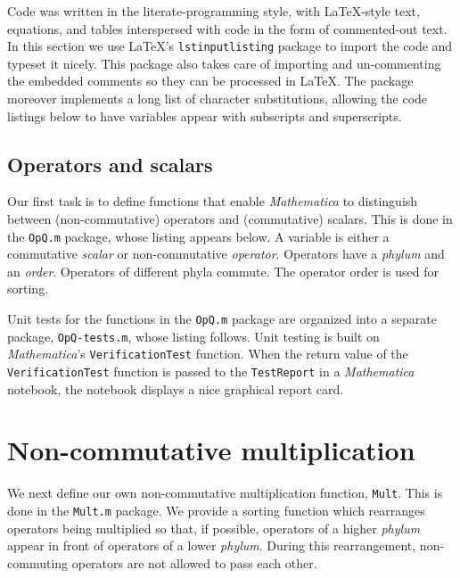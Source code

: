 \documentclass[12pt,letterpaper]{refart}
\begin{document}
Code was written in the literate-programming style, with \LaTeX{}-style text, equations, and tables interspersed with code in the form of commented-out text.
In this section we use \LaTeX{}'s \verb+lstinputlisting+ package to import the code and typeset it nicely.
This package also takes care of importing and un-commenting the embedded comments so they can be processed in \LaTeX.
The package moreover implements a long list of character substitutions, allowing the code listings below to have variables appear with subscripts and superscripts.

\subsection{Operators and scalars}

Our first task is to define functions that enable \emph{Mathematica} to distinguish between (non-commutative) operators and (commutative) scalars. 
This is done in the \verb+OpQ.m+ package, whose listing appears below. 
A variable is either a commutative \emph{scalar} or non-commutative \emph{operator}.
Operators have a \emph{phylum} and an \emph{order}.
Operators of different phyla commute.
The operator order is used for sorting.



Unit tests for the functions in the \verb+OpQ.m+ package are organized into a separate package, \verb+OpQ-tests.m+, whose listing follows. 
Unit testing is built on \emph{Mathematica}'s \verb+VerificationTest+ function.
When the return value of the \verb+VerificationTest+ function is passed to the \verb+TestReport+ in a \emph{Mathematica} notebook, the notebook displays a nice graphical report card.



\section{Non-commutative multiplication}

We next define our own non-commutative multiplication function, \verb+Mult+.
This is done in the \verb+Mult.m+ package.
We provide a sorting function which rearranges operators being multiplied so that, if possible, operators of a higher \emph{phylum} appear in front of operators of a lower \emph{phylum}.
During this rearrangement, non-commuting operators are not allowed to pass each other.
\end{document}
